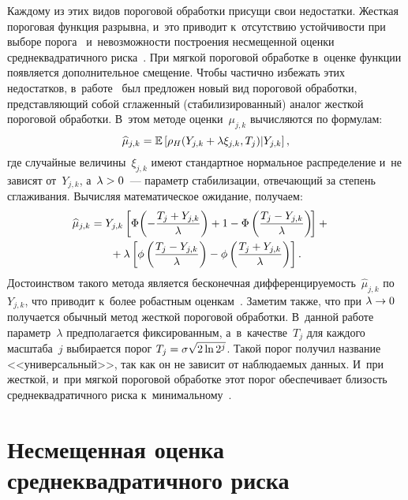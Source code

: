 \begin{multicols}{2}
Каждому из этих видов пороговой обработки присущи свои недостатки. 
Жесткая пороговая функция разрывна, и~это приводит к~отсутствию устойчивости 
при выборе порога~\cite{B96} и~невозможности построения несмещенной оценки 
среднеквадратичного риска~\cite{J01}. При мягкой пороговой обработке в~оценке 
функции появляется дополнительное смещение. Чтобы частично избежать этих недостатков, 
в~работе~\cite{HL10} был предложен новый вид пороговой обработки, представляющий 
собой сглаженный (стабилизированный) аналог жесткой пороговой обработки. 
В~этом методе оценки~$\mu_{j,k}$ вычисляются по формулам:
\begin{equation*}
\widehat{\mu}_{j,k}=\Expect 
\left[\rho_{H}(Y_{j,k}+\lambda\xi_{j,k},T_j)|Y_{j,k}\right], %
\end{equation*}
где случайные величины~$\xi_{j,k}$ имеют стандартное нормальное распределение и~не 
зависят от~$Y_{j,k}$, а~$\lambda\hm>0$~--- 
параметр стабилизации, отвечающий за степень сглаживания. Вычисляя математическое 
ожидание, получаем:
\begin{multline*}
\hspace*{-8.37947pt}\widehat{\mu}_{j,k}=Y_{j,k}\left[\Phi\!\left(-\fr{T_j+Y_{j,k}}
{\lambda}\right)+1-\Phi\left(\fr{T_j-Y_{j,k}}{\lambda}\right)\!\right]+{}\\
{}+
\lambda\left[\phi\left(\fr{T_j-Y_{j,k}}{\lambda}\right)-
\phi\left(\fr{T_j+Y_{j,k}}{\lambda}\right)\right]. %
\end{multline*}
Достоинством такого метода является бесконечная дифференцируемость~$\widehat{\mu}_{j,k}$ 
по~$Y_{j,k}$, что приводит к~более робастным оценкам~\cite{HL10}. Заметим также, 
что при $\lambda\hm\to0$ получается обычный метод жесткой пороговой обработки. 
В~данной работе параметр~$\lambda$ предполагается фиксированным, а~в~качестве~$T_j$ 
для каждого масштаба~$j$ выбирается порог $T_j\hm=\sigma\sqrt{2\ln 2^j}$. 
Такой порог получил название <<универсальный>>, так как он не зависит 
от наблюдаемых данных. И~при жесткой, и~при мягкой пороговой обработке этот 
порог обеспечивает близость среднеквадратичного риска к~минимальному~\cite{Mal99}.

\section{Несмещенная оценка среднеквадратичного риска}


\end{multicols}
